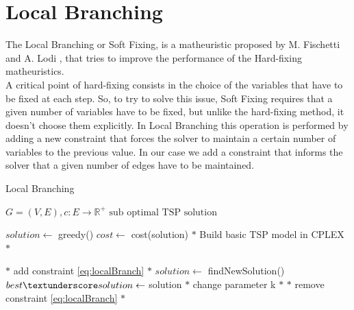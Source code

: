 \section{Local Branching}

The Local Branching or Soft Fixing, is a matheuristic proposed by M. Fischetti and A. Lodi \cite{fischetti2003local}, that tries to improve the performance of the Hard-fixing matheuristics.\\
A critical point of hard-fixing consists in the choice of the variables that have to be fixed at each step. So, to try to solve this issue, Soft Fixing requires that a given number of variables have to be fixed, but unlike the hard-fixing method, it doesn’t choose them explicitly. In Local Branching this operation is performed by adding a new constraint that forces the solver to maintain a certain number of variables to the previous value. In our case we add a constraint that informs the solver that a given number of edges have to be maintained. \\

\begin{algorithm}[h!]
    \caption{Local Branching}\label{algo:SoftFixing}
    \begin{algorithmic}[1]
    \Require $G = (V,E), c:E \to \mathbb{R}^+$
    \Ensure $\text{sub optimal TSP solution}$

    \State $solution \gets$ greedy()
    \State $cost \gets $ cost(solution)
    \State $*$ Build basic TSP model in CPLEX $*$



    \State $*$ add constraint \ref{eq:localBranch} $*$
    \State $solution \gets$ findNewSolution()
    \State $ best\textunderscore solution \gets$ solution
    \State $*$ change parameter k $*$
    \EndIf
    \State $*$ remove constraint \ref{eq:localBranch} $*$
    \EndWhile

    \end{algorithmic}
\end{algorithm}

